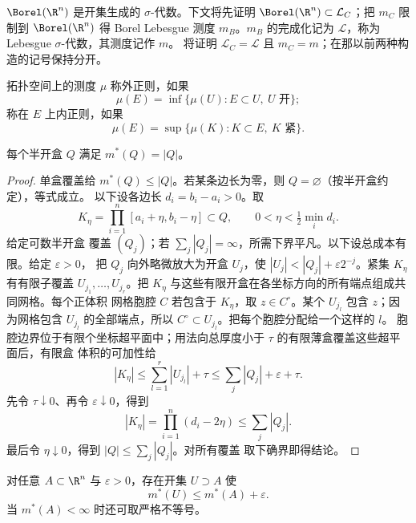 \begin{definition}\label{def:2-1-3-2}
$\Borel(\R^n)$ 是开集生成的 $\sigma$-代数。下文将先证明
$\Borel(\R^n)\subset\mathcal L_C$；把 $m_C$ 限制到 $\Borel(\R^n)$ 得 Borel Lebesgue 测度
$m_B$。$m_B$ 的完成化记为 $\mathcal L$，称为 Lebesgue $\sigma$-代数，其测度记作 $m$。
 将证明 $\mathcal L_C=\mathcal L$ 且
$m_C=m$；在那以前两种构造的记号保持分开。
\end{definition}

\begin{definition}[正则性]\label{def:2-1-3-3}
拓扑空间上的测度 $\mu$ 称外正则，如果
\[
 \mu(E)=\inf\{\mu(U):E\subset U,\ U\text{ 开}\};
\]
称在 $E$ 上内正则，如果
\[
 \mu(E)=\sup\{\mu(K):K\subset E,\ K\text{ 紧}\}.
\]
\end{definition}

\begin{lemma}[盒的外测度]\label{lem:lebesgue-box-lower-bound}
每个半开盒 $Q$ 满足 $m^*(Q)=|Q|$。
\end{lemma}

\begin{proof}
单盒覆盖给 $m^*(Q)\le|Q|$。若某条边长为零，则 $Q=\varnothing$（按半开盒约定），等式成立。
以下设各边长 $d_i=b_i-a_i>0$。取
\[
 K_\eta=\prod_{i=1}^n[a_i+\eta,b_i-\eta]
 \subset Q,
 \qquad0<\eta<\tfrac12\min_i d_i.
\]
给定可数半开盒
覆盖 $(Q_j)$；若 $\sum_j|Q_j|=\infty$，所需下界平凡。以下设总成本有限。给定 $\varepsilon>0$，
把 $Q_j$ 向外略微放大为开盒 $U_j$，使 $|U_j|<|Q_j|+\varepsilon2^{-j}$。紧集 $K_\eta$ 有有限子覆盖
$U_{j_1},\dots,U_{j_r}$。把 $K_\eta$ 与这些有限开盒在各坐标方向的所有端点组成共同网格。每个正体积
网格胞腔 $C$ 若包含于 $K_\eta$，取 $z\in C^\circ$。某个 $U_{j_l}$ 包含 $z$；因为网格包含
$U_{j_l}$ 的全部端点，所以 $C^\circ\subset U_{j_l}$。把每个胞腔分配给一个这样的 $l$。
胞腔边界位于有限个坐标超平面中；用法向总厚度小于 $\tau$ 的有限薄盒覆盖这些超平面后，有限盒
体积的可加性给
\[
 |K_\eta|\le\sum_{l=1}^r|U_{j_l}|+\tau
 \le\sum_j|Q_j|+\varepsilon+\tau.
\]
先令 $\tau\downarrow0$、再令
$\varepsilon\downarrow0$，得到
\[
 |K_\eta|=\prod_{i=1}^n(d_i-2\eta)\le\sum_j|Q_j|.
\]
最后令 $\eta\downarrow0$，得到
$|Q|\le\sum_j|Q_j|$。对所有覆盖
取下确界即得结论。
\end{proof}

\begin{lemma}[任意集合的开外逼近]\label{lem:lebesgue-outer-open-approximation}
对任意 $A\subset\R^n$ 与 $\varepsilon>0$，存在开集 $U\supset A$ 使
\[
 m^*(U)\le m^*(A)+\varepsilon.
\]
当 $m^*(A)<\infty$ 时还可取严格不等号。
\end{lemma}

